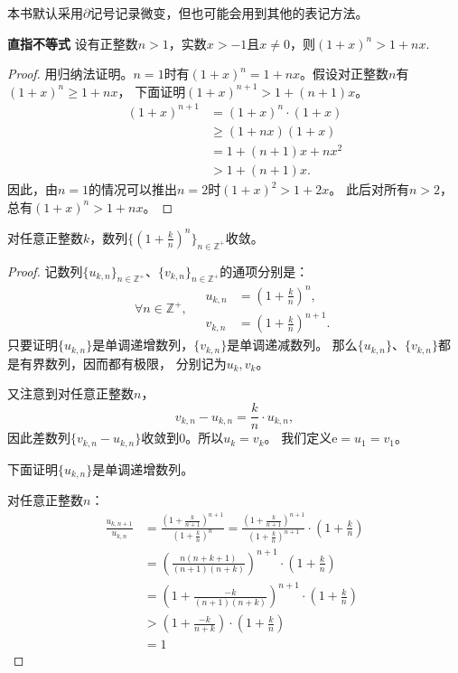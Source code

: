 \documentclass[12pt,UTF8]{ctexbook}
\begin{document}
\begin{appendix}
\begin{df}
本书默认采用$\partial$记号记录微变，但也可能会用到其他的表记方法。
\end{df}

\begin{tm}{\textbf{直指不等式}}\label{tm:b-1-20}
    设有正整数$n > 1$，实数$x > -1$且$x \neq 0$，则$(1 + x)^n > 1 + nx.$
\end{tm}

\begin{proof}
    用归纳法证明。$n = 1$时有$(1 + x)^n = 1 + nx$。假设对正整数$n$有$(1 + x)^n \geqslant 1 + nx$，
    下面证明$(1 + x)^{n+1} > 1 + (n+1)x$。
    \begin{align*}
        (1 + x)^{n+1} &= (1 + x)^{n} \cdot (1 + x)  \\
        &\geqslant (1 + nx)(1 + x)  \\
        &= 1 + (n + 1)x + nx^2  \\
        &> 1 + (n + 1)x.
   \end{align*}
   因此，由$n=1$的情况可以推出$n=2$时$(1 + x)^{2} > 1 + 2x$。
   此后对所有$n>2$，总有$(1 + x)^{n} > 1 + nx$。
\end{proof}

\begin{tm}\label{tm:b-1-30}
    对任意正整数$k$，数列$\{\left(1 + \frac{k}{n}\right)^n\}_{n\in\mathbb{Z}^+}$收敛。
\end{tm}

\begin{proof}
    记数列$\{u_{k,n}\}_{n\in\mathbb{Z}^+}$、$\{v_{k,n}\}_{n\in\mathbb{Z}^+}$的通项分别是：
    $$
    \forall n \in\mathbb{Z}^+, \quad
    \begin{array}{cl}
        u_{k,n} &=  \left(1 + \frac{k}{n}\right)^n, \\
        v_{k,n} &= \left(1 + \frac{k}{n}\right)^{n+1}.
    \end{array}
    $$
    只要证明$\{u_{k,n}\}$是单调递增数列，$\{v_{k,n}\}$是单调递减数列。
    那么$\{u_{k,n}\}$、$\{v_{k,n}\}$都是有界数列，因而都有极限，
    分别记为$u_{k}, v_k$。

    又注意到对任意正整数$n$，
    $$v_{k,n} - u_{k,n} = \frac{k}{n} \cdot u_{k,n}, $$
    因此差数列$\{v_{k,n} - u_{k,n}\}$收敛到$0$。所以$u_k = v_k$。
    我们定义$\mathrm{e} = u_1 = v_1$。

    下面证明$\{u_{k,n}\}$是单调递增数列。

    对任意正整数$n$：
    \begin{align*}
        \frac{u_{k,n+1}}{u_{k,n}} &= \frac{\left(1 + \frac{k}{n+1}\right)^{n+1}}{\left(1 + \frac{k}{n}\right)^n} = \frac{\left(1 + \frac{k}{n+1}\right)^{n+1}}{\left(1 + \frac{k}{n}\right)^{n+1}} \cdot \left(1 + \frac{k}{n}\right)  \\
        &= \left(\frac{n(n+k+1)}{(n+1)(n+k)}\right)^{n+1} \cdot \left(1 + \frac{k}{n}\right)  \\
        &= \left(1 + \frac{-k}{(n+1)(n+k)}\right)^{n+1} \cdot \left(1 + \frac{k}{n}\right)  \\
        &> \left(1 + \frac{-k}{n+k}\right)\cdot \left(1 + \frac{k}{n}\right) \tag{直指不等式} \\
        &= 1  
    \end{align*}
    

\end{proof}
\end{appendix}
\end{document}
